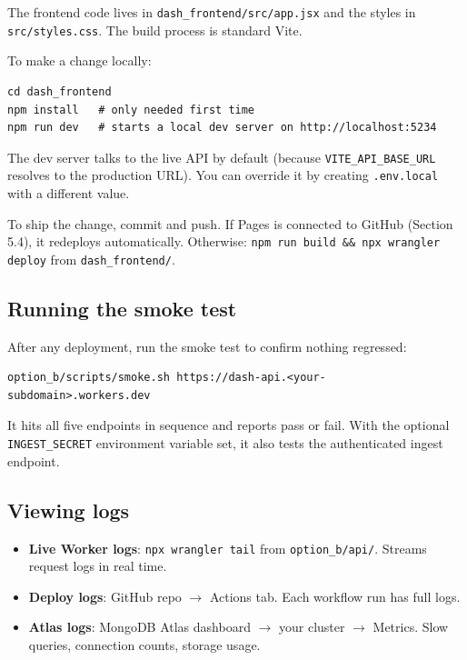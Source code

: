 \documentclass[11pt,a4paper]{article}
\begin{document}
The frontend code lives in \texttt{dash\_frontend/src/app.jsx} and the styles in \texttt{src/styles.css}. The build process is standard Vite.

To make a change locally:

\begin{lstlisting}[style=shell]
cd dash_frontend
npm install   # only needed first time
npm run dev   # starts a local dev server on http://localhost:5234
\end{lstlisting}

The dev server talks to the live API by default (because \texttt{VITE\_API\_BASE\_URL} resolves to the production URL). You can override it by creating \texttt{.env.local} with a different value.

To ship the change, commit and push. If Pages is connected to GitHub (Section 5.4), it redeploys automatically. Otherwise: \texttt{npm run build \&\& npx wrangler deploy} from \texttt{dash\_frontend/}.

\subsection{Running the smoke test}

After any deployment, run the smoke test to confirm nothing regressed:

\begin{lstlisting}[style=shell]
option_b/scripts/smoke.sh https://dash-api.<your-subdomain>.workers.dev
\end{lstlisting}

It hits all five endpoints in sequence and reports pass or fail. With the optional \texttt{INGEST\_SECRET} environment variable set, it also tests the authenticated ingest endpoint.

\subsection{Viewing logs}

\begin{itemize}[leftmargin=1.5em,itemsep=2pt]
  \item \textbf{Live Worker logs}: \texttt{npx wrangler tail} from \texttt{option\_b/api/}. Streams request logs in real time.
  \item \textbf{Deploy logs}: GitHub repo \(\rightarrow\) Actions tab. Each workflow run has full logs.
  \item \textbf{Atlas logs}: MongoDB Atlas dashboard \(\rightarrow\) your cluster \(\rightarrow\) Metrics. Slow queries, connection counts, storage usage.
\end{itemize}
\end{document}

